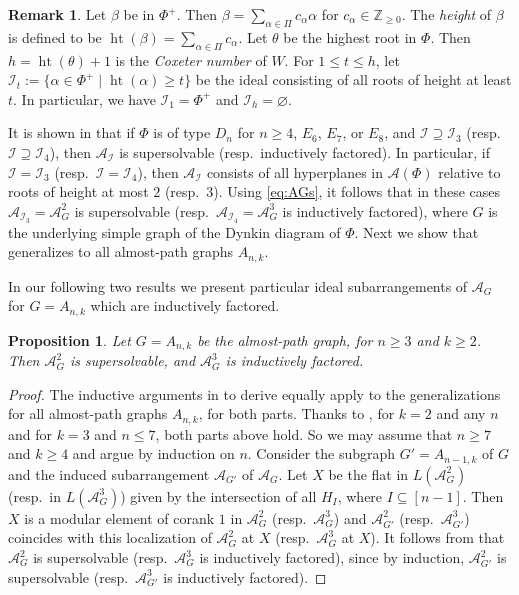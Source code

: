\documentclass[12pt]{amsart}
\newcommand\CA{{\mathscr A}}
\newcommand\CI{{\mathcal I}}
\newcommand\BBZ{{\mathbb Z}}
\newcommand\hgt{\operatorname{ht}}
\numberwithin{equation}{section}
\theoremstyle{plain}
\newtheorem{prop}[equation]{Proposition}
\theoremstyle{definition}
\newtheorem{remark}[equation]{Remark}
\begin{document}
\begin{remark}
    \label{rem:AGs}
Let $\beta$ be in $\Phi^+$. Then $\beta = \sum_{\alpha \in \Pi} c_\alpha \alpha$
for $c_\alpha \in \BBZ_{\ge0}$.
The \emph{height} of $\beta$ is defined to be $\hgt(\beta) = \sum_{\alpha \in \Pi} c_\alpha$.
Let $\theta$ be the highest root in $\Phi$.
Then $h = \hgt(\theta) + 1$ is the 
\emph{Coxeter number} of $W$. For $1 \le t \le h$, let 
$\CI_t :=\{\alpha \in \Phi^+ \mid \hgt(\alpha) \ge t\}$ be the ideal consisting of all roots of height at least $t$.
In particular, we have $\CI_1 = \Phi^+$ and $\CI_h = \varnothing$.
    
It is shown in \cite[Thm.~1.31]{roehrle:ideal} 
that if 
$\Phi$ is of type $D_n$ for $n \ge 4$, $E_6$, $E_7$, or $E_8$, 
and $\CI \supseteq \CI_3$ (resp.~$\CI \supseteq \CI_4$), 
then $\CA_\CI$ is supersolvable (resp.~inductively factored).
In particular, if $\CI = \CI_3$ (resp.~$\CI = \CI_4$), then $\CA_\CI$ consists of all hyperplanes in  $\CA(\Phi)$ relative to roots of height at most $2$ (resp.~$3$). Using \eqref{eq:AGs}, it follows that in these cases $\CA_{\CI_3} = \CA_G^2$ is supersolvable (resp.~$\CA_{\CI_4} = \CA_G^3$ is inductively factored), where  
$G$ is the underlying simple graph of the Dynkin diagram of $\Phi$. 
Next we show that \cite[Thm.~1.31]{roehrle:ideal} generalizes to all almost-path graphs $A_{n,k}$. \end{remark}

In our following two results we present 
particular ideal subarrangements of $\CA_G$ for 
$G = A_{n,k}$ which are inductively factored.

\begin{prop}
    \label{prop:AGs} 
    Let $G = A_{n,k}$ be the almost-path graph, for $n \ge 3$ and $k \ge 2$. Then 
$\CA_G^2$ is supersolvable, and 
$\CA_G^3$ is inductively factored.
\end{prop}

\begin{proof}
The inductive arguments in 
\cite{roehrle:ideal} to derive \cite[Thm.~1.31]{roehrle:ideal} equally apply to the 
generalizations for all almost-path graphs
$A_{n,k}$, for both parts.
Thanks to \cite[Thm.~1.31]{roehrle:ideal}, for $k = 2$ and any $n$ and for $k = 3$ and $n \le 7$, both parts above hold. 
So we may assume that $n \ge 7$ and $k \ge 4$ and argue by induction on $n$. 
Consider the subgraph $G' = A_{n-1,k}$ of $G$ and the induced 
subarrangement $\CA_{G'}$  of $\CA_G$. 
Let $X$ be the flat in $L(\CA_G^2)$ (resp.~in $L(\CA_G^3)$) given by the intersection of all $H_I$, where $I \subseteq [n-1]$. Then $X$ is a modular element of corank $1$ in $\CA_G^2$
(resp.~$\CA_G^3$) and 
$\CA_{G'}^2$ (resp.~$\CA_{G'}^3$) coincides with this localization of $\CA_G^2$ at $X$ (resp.~$\CA_G^3$ at $X$). It follows from  \cite[Thm.~1.12, Lem.~3.1, Lem.~3.4]{roehrle:ideal} that $\CA_G^2$ is supersolvable (resp.~$\CA_G^3$ is inductively factored), since  by induction, $\CA_{G'}^2$ is supersolvable (resp.~$\CA_{G'}^3$ is inductively factored).
\end{proof}
\end{document}
